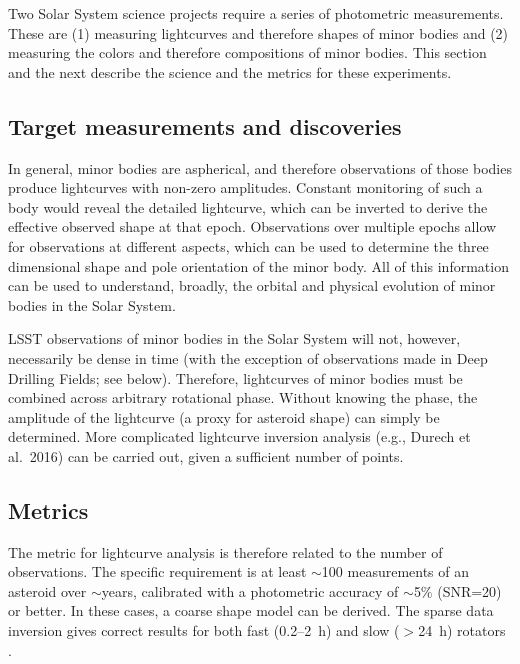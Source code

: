 Two Solar System science projects require
a series of photometric measurements. These
are (1) measuring lightcurves and therefore
shapes of minor bodies and (2) measuring
the colors and therefore compositions of
minor bodies. This section and the next describe
the science and the metrics for these
experiments.


\subsection{Target measurements and discoveries}
\label{sec:\secname:targets}

In general, minor bodies are aspherical,
and therefore observations of those bodies
produce lightcurves with non-zero amplitudes.
Constant monitoring of such a body would
reveal the detailed lightcurve, which can
be inverted to derive the effective observed
shape at that epoch.
Observations
over multiple epochs allow for observations
at different aspects, which can be used to
determine the three dimensional shape and pole
orientation of the minor body. All of this
information can be used to understand,
broadly, the orbital and physical evolution
of minor bodies in the Solar System.

LSST observations of minor bodies in the Solar System
will not, however, necessarily be dense in time
(with the exception of observations made in
Deep Drilling Fields; see below).
Therefore, lightcurves of minor bodies must
be combined across arbitrary rotational phase.
Without knowing the phase, the amplitude of
the lightcurve (a proxy for
asteroid shape) can simply be determined.
More complicated lightcurve inversion analysis
(e.g., Durech et al.\ 2016)
can be carried out, given a sufficient number
of points.



\subsection{Metrics}
\label{sec:\secname:metrics}

The metric for lightcurve analysis
is therefore related to the number
of observations. The specific requirement
is
at least $\sim$100 measurements of an asteroid over
$\sim$years,
calibrated with a photometric accuracy of
$\sim$5\% (SNR=20)
or better. In these cases,
a coarse shape model can be derived.
The sparse data inversion gives correct results for both fast (0.2--2~h) and
slow ($>$24~h) rotators \citep{2007IAUS..236..191D}.



